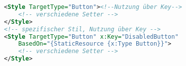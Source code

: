 \begin{lstlisting}[language=xml]
<Style TargetType="Button"><!--Nutzung über Key-->
    <!-- verschiedene Setter -->
</Style>
<!-- spezifischer Stil, Nutzung über Key -->
<Style TargetType="Button" x:Key="DisabledButton" 
    BasedOn="{StaticResource {x:Type Button}}">
    <!-- verschiedene Setter -->
</Style>
\end{lstlisting}